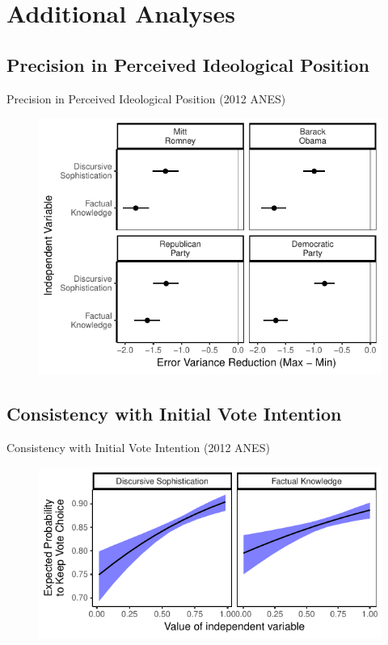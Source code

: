 \section{Additional Analyses}

\subsection{Precision in Perceived Ideological Position}
\begin{frame}{Precision in Perceived Ideological Position (2012 ANES)}\label{hetreg}
  \begin{figure}
  \includegraphics{fig/hetreg_pres.pdf}
  \end{figure}
\end{frame}

\subsection{Consistency with Initial Vote Intention}
\begin{frame}{Consistency with Initial Vote Intention (2012 ANES)}\label{prepost}
  \begin{figure}
  \includegraphics{fig/prepost_exp.pdf}
  \end{figure}
\end{frame}

